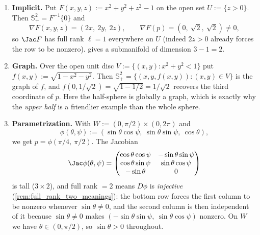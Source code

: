 \begin{example}
\label{ex:half_sphere_three_ways}
\begin{enumerate}[label=\textbf{(\alph*)}]
  \item \textbf{Implicit.} Put $F(x,y,z) := x^2+y^2+z^2-1$ on the open set
    $U := \{z>0\}$. Then $\mathbb{S}^2_+ = F^{-1}\{0\}$ and
    \[\nabla F(x,y,z) = (2x,\ 2y,\ 2z), \qquad \nabla F(p) = (0,\ \sqrt2,\ \sqrt2) \neq 0,\]
    so $\Jac F$ has full rank $\ell = 1$ everywhere on $U$ (indeed $2z > 0$ already forces the
    row to be nonzero).  gives a submanifold of dimension
    $3-1 = 2$.
  \item \textbf{Graph.} Over the open unit disc $V := \{(x,y) : x^2+y^2 < 1\}$ put
    $f(x,y) := \sqrt{1-x^2-y^2}$. Then $\mathbb{S}^2_+ = \{(x,y,f(x,y)) : (x,y) \in V\}$ is the
    graph of $f$, and $f(0,1/\sqrt2) = \sqrt{1-1/2} = 1/\sqrt2$ recovers the third coordinate of
    $p$. Here the half-sphere is globally a graph, which is exactly why the \emph{upper half} is
    a friendlier example than the whole sphere.
  \item \textbf{Parametrization.} With $W := (0,\pi/2) \times (0,2\pi)$ and
    \[\phi(\theta,\psi) := (\sin\theta\cos\psi,\ \sin\theta\sin\psi,\ \cos\theta),\]
    we get $p = \phi(\pi/4,\ \pi/2)$. The Jacobian
    \[\Jac\phi(\theta,\psi) = \begin{pmatrix}
        \cos\theta\cos\psi & -\sin\theta\sin\psi \\
        \cos\theta\sin\psi & \sin\theta\cos\psi \\
        -\sin\theta & 0
      \end{pmatrix}\]
    is tall ($3\times2$), and full rank $=2$ means $D\phi$ is \emph{injective}
    (\cref{rem:full_rank_two_meanings}): the bottom row forces the first column to be nonzero
    whenever $\sin\theta \neq 0$, and the second column is then independent of it because
    $\sin\theta \neq 0$ makes $(-\sin\theta\sin\psi,\ \sin\theta\cos\psi)$ nonzero. On $W$ we
    have $\theta \in (0,\pi/2)$, so $\sin\theta > 0$ throughout.
\end{enumerate}
\end{example}

